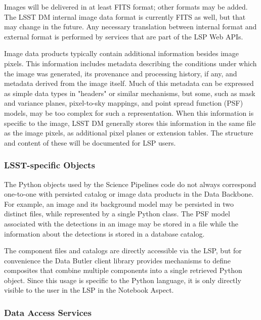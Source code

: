 Images will be delivered in at least FITS format; other formats may be added.
The LSST DM internal image data format is currently FITS as well, but that may
change in the future.  Any necessary translation between internal format and
external format is performed by services that are part of the LSP Web APIs.

Image data products typically contain additional information besides image
pixels.  This information includes metadata describing the conditions under
which the image was generated, its provenance and processing history, if any,
and metadata derived from the image itself.  Much of this metadata can be
expressed as simple data types in "headers" or similar mechanisms, but some,
such as mask and variance planes, pixel-to-sky mappings, and point spread
function (PSF) models, may be too complex for such a representation.  When this
information is specific to the image, LSST DM generally stores this information
in the same file as the image pixels, as additional pixel planes or extension
tables.  The structure and content of these will be documented for LSP users.

\subsubsection{LSST-specific Objects}\label{lsst-specific-objects}

The Python objects used by the Science Pipelines code do not always
correspond one-to-one with persisted catalog or image data products in the
Data Backbone.
For example, an image and its background model may be persisted
in two distinct files, while represented by a single Python class.
The PSF model associated with the detections in an
image may be stored in a file while the information about the detections is
stored in a database catalog.

The component files and catalogs are directly accessible via the LSP, but
for convenience the Data Butler client library provides mechanisms to define
composites that combine multiple components into a single retrieved Python
object.  Since this usage is specific to the Python language, it is only
directly visible to the user in the LSP in the Notebook Aspect.

\subsubsection{Data Access Services}\label{data-access-services}

